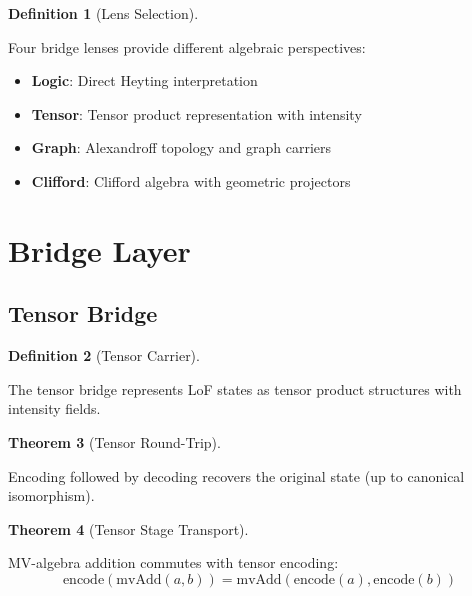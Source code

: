 \documentclass{amsart}
\theoremstyle{definition}
\newtheorem{definition}{Definition}[section]
\newtheorem{theorem}[definition]{Theorem}
\theoremstyle{remark}
\begin{document}
\begin{definition}[Lens Selection]
\label{def:lens}
\uses{}

Four bridge lenses provide different algebraic perspectives:
\begin{itemize}
\item \textbf{Logic}: Direct Heyting interpretation
\item \textbf{Tensor}: Tensor product representation with intensity
\item \textbf{Graph}: Alexandroff topology and graph carriers
\item \textbf{Clifford}: Clifford algebra with geometric projectors
\end{itemize}
\end{definition}

\section{Bridge Layer}

\subsection{Tensor Bridge}
\label{sec:tensor-bridge}

\begin{definition}[Tensor Carrier]
\label{def:tensor-carrier}
\uses{}

The tensor bridge represents LoF states as tensor product structures with intensity fields.
\end{definition}

\begin{theorem}[Tensor Round-Trip]
\label{thm:tensor-rt}
\leanok
{}

Encoding followed by decoding recovers the original state (up to canonical isomorphism).
\end{theorem}

\begin{theorem}[Tensor Stage Transport]
\label{thm:tensor-stage}
\leanok
{}

MV-algebra addition commutes with tensor encoding:
\[
\text{encode}(\text{mvAdd}(a, b)) = \text{mvAdd}(\text{encode}(a), \text{encode}(b))
\]
\end{theorem}
\end{document}
